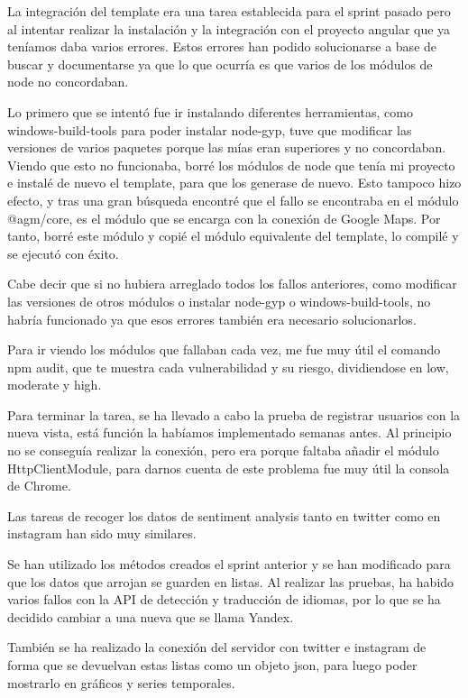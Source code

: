 La integración del template era una tarea establecida para el sprint pasado pero al intentar realizar la instalación y la integración con el proyecto angular que ya teníamos daba varios errores. 
Estos errores han podido solucionarse a base de buscar y documentarse ya que lo que ocurría es que varios de los módulos de node no concordaban.

Lo primero que se intentó fue ir instalando diferentes herramientas, como windows-build-tools para poder instalar node-gyp, tuve que modificar las versiones de varios paquetes porque las mías eran superiores y no concordaban.
Viendo que esto no funcionaba, borré los módulos de node que tenía mi proyecto e instalé de nuevo el template, para que los generase de nuevo. Esto tampoco hizo efecto, y tras una gran búsqueda encontré que el fallo se encontraba en el módulo @agm/core, es el módulo que se encarga con la conexión de Google Maps. Por tanto, borré este módulo y copié el módulo equivalente del template, lo compilé y se ejecutó con éxito.

Cabe decir que si no hubiera arreglado todos los fallos anteriores, como modificar las versiones de otros módulos o instalar node-gyp o windows-build-tools, no habría funcionado ya que esos errores también era necesario solucionarlos.

Para ir viendo los módulos que fallaban cada vez, me fue muy útil el comando npm audit, que te muestra cada vulnerabilidad y su riesgo, dividiendose en low, moderate y high.

Para terminar la tarea, se ha llevado a cabo la prueba de registrar usuarios con la nueva vista, está función la habíamos implementado semanas antes. Al principio no se conseguía realizar la conexión, pero era porque faltaba añadir el módulo HttpClientModule, para darnos cuenta de este problema fue muy útil la consola de Chrome.

Las tareas de recoger los datos de sentiment analysis tanto en twitter como en instagram han sido muy similares.

Se han utilizado los métodos creados el sprint anterior y se han modificado para que los datos que arrojan se guarden en listas. 
Al realizar las pruebas, ha habido varios fallos con la API de detección y traducción de idiomas, por lo que se ha decidido cambiar a una nueva que se llama Yandex.

También se ha realizado la conexión del servidor con twitter e instagram de forma que se devuelvan estas listas como un objeto json, para luego poder mostrarlo en gráficos y series temporales.

